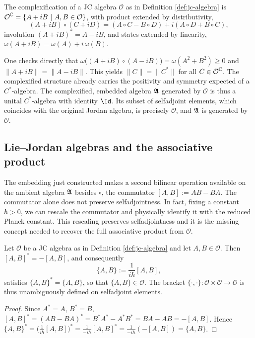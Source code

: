 \begin{definition}[Complexification]
	The complexification of a JC algebra $\mathcal{O}$ as in Definition \ref{def:jc-algebra} is
	$\mathcal{O}^{\C}=\{A+iB \ | \ A,B\in\mathcal{O}\}$, with product
	extended by distributivity,
	\[
	(A+iB)\circ(C+iD)=(A\circ C-B\circ D)+i(A\circ D+B\circ C),
	\]
	involution $(A+iB)^*=A-iB$, and states extended by linearity,
	$\omega(A+iB)=\omega(A)+i\,\omega(B)$.
\end{definition}

One checks directly that
$\omega\big((A+iB)\circ(A-iB)\big)=\omega(A^2+B^2)\ge0$ and
$\|A+iB\|=\|A-iB\|$. This yields $\|C\|=\|C^*\|$ for all
$C\in\mathcal{O}^{\C}$. The complexified structure already carries
the positivity and symmetry expected of a $C^*$-algebra. The complexified,
embedded algebra $\mathfrak{A}$ generated by $\mathcal{O}$ is thus a unital
$C^*$-algebra with identity $\Id$. Its subset of selfadjoint elements,
which coincides with the original Jordan algebra, is precisely
$\mathcal{O}$, and $\mathfrak{A}$ is generated by $\mathcal{O}$.

\subsection*{Lie--Jordan algebras and the associative product}

The embedding just constructed makes a second bilinear operation available
on the ambient algebra $\mathfrak{A}$ besides $\circ$, the commutator
$[A,B]:=AB-BA$. The commutator alone does not preserve selfadjointness. 
In fact, fixing a constant $\hbar > 0$,  we can rescale the commutator and
physically identify it with the reduced Planck constant. This rescaling preserves selfadjointness and it is the missing concept needed to recover the full associative
product from $\mathcal{O}$.

\begin{proposition}\label{prop:quantum-comm}
	Let $\mathcal{O}$ be a JC algebra as in Definition \ref{def:jc-algebra} and let $A,B\in\mathcal{O}$. Then $[A,B]^*=-[A,B]$, and consequently
	\[
	\{A,B\} := \frac{1}{i\hbar}[A,B],
	\]
	satisfies $\{A,B\}^*=\{A,B\}$, so that $\{A,B\}\in\mathcal{O}$. The
	bracket $\{\cdot,\cdot\}:\mathcal{O}\times\mathcal{O}\to\mathcal{O}$ is
	thus unambiguously defined on selfadjoint elements.
\end{proposition}
\begin{proof}
	Since $A^*=A$, $B^*=B$,
	$[A,B]^*=(AB-BA)^*=B^*A^*-A^*B^*=BA-AB=-[A,B]$. Hence
	$\{A,B\}^*=\big(\tfrac{1}{i\hbar}[A,B]\big)^*=\tfrac{1}{-i\hbar}[A,B]^*
	=\tfrac{1}{-i\hbar}(-[A,B])=\{A,B\}$.
\end{proof}

